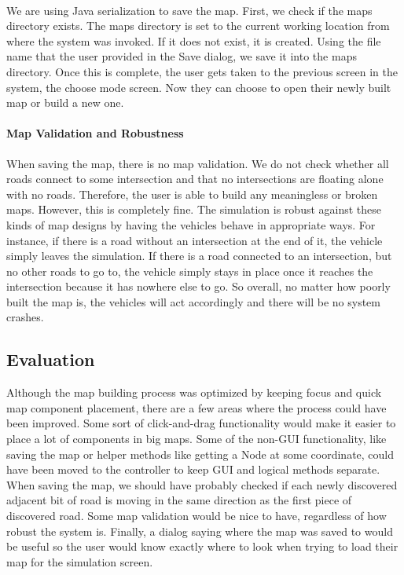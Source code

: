 \documentclass[a4paper,11pt,titlepage]{article}
\begin{document}
\paragraph{}
We are using Java serialization to save the map. First, we check if the maps directory exists. The maps directory is set to the current working location from where the system was invoked. If it does not exist, it is created. Using the file name that the user provided in the Save dialog, we save it into the maps directory. Once this is complete, the user gets taken to the previous screen in the system, the choose mode screen. Now they can choose to open their newly built map or build a new one.
\paragraph{Map Validation and Robustness}
When saving the map, there is no map validation. We do not check whether all roads connect to some intersection and that no intersections are floating alone with no roads. Therefore, the user is able to build any meaningless or broken maps. However, this is completely fine. The simulation is robust against these kinds of map designs by having the vehicles behave in appropriate ways. For instance, if there is a road without an intersection at the end of it, the vehicle simply leaves the simulation. If there is a road connected to an intersection, but no other roads to go to, the vehicle simply stays in place once it reaches the intersection because it has nowhere else to go. So overall, no matter how poorly built the map is, the vehicles will act accordingly and there will be no system crashes.

\subsection{Evaluation}
Although the map building process was optimized by keeping focus and quick map component placement, there are a few areas where the process could have been improved. Some sort of click-and-drag functionality would make it easier to place a lot of components in big maps. Some of the non-GUI functionality, like saving the map or helper methods like getting a Node at some coordinate, could have been moved to the controller to keep GUI and logical methods separate. When saving the map, we should have probably checked if each newly discovered adjacent bit of road is moving in the same direction as the first piece of discovered road. Some map validation would be nice to have, regardless of how robust the system is. Finally, a dialog saying where the map was saved to would be useful so the user would know exactly where to look when trying to load their map for the simulation screen.
\end{document}
